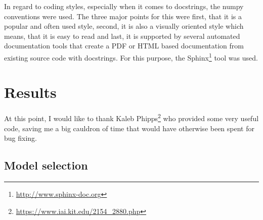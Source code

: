 In regard to coding styles, especially when it comes to docstrings, the numpy conventions were used. The three major points for this were first, that it is a popular and often used style, second, it is also a visually oriented style which means, that it is easy to read and last, it is supported by several automated documentation tools that create a PDF or HTML based documentation from existing source code with docstrings. For this purpose, the Sphinx\footnote{\url{http://www.sphinx-doc.org}} tool was used.\\


\section{Results}
\label{sec:results}

At this point, I would like to thank Kaleb Phipps\footnote{\url{https://www.iai.kit.edu/2154_2880.php}} who provided some very useful code, saving me a big cauldron of time that would have otherwise been spent for bug fixing.\\

\subsection*{Model selection}

